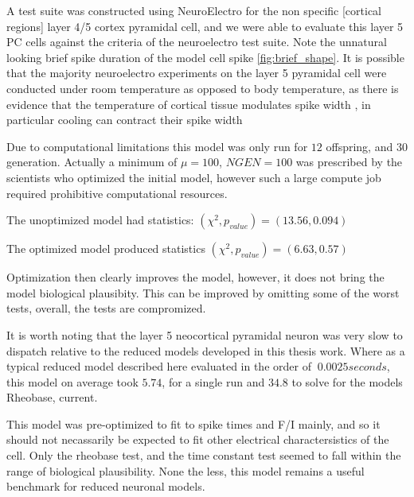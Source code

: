 

A test suite was constructed using NeuroElectro for the non specific [cortical regions] layer 4/5 cortex pyramidal cell, and we were able to evaluate this layer 5 PC cells against the criteria of the neuroelectro test suite. Note the unnatural looking brief spike duration of the model cell spike  \ref{fig:brief_shape}. It is possible that the majority neuroelectro experiments on the layer 5 pyramidal cell were conducted under room temperature as opposed to body temperature, as there is evidence that the temperature of cortical tissue modulates spike width \cite{goldin2017temperature}, in particular cooling can contract their spike width

%


Due to computational limitations this model was only run for 
$12$ offspring, and $30$ generation. Actually a minimum of $\mu=100$, $NGEN =100$ was prescribed by the scientists who optimized the initial model, however such a large compute job required prohibitive computational resources.

The unoptimized model had statistics:
$(\chi^{2},p_{value})=(13.56, 0.094)$

The optimized model produced statistics
$(\chi^{2},p_{value})=(6.63, 0.57)$

Optimization then clearly improves the model, however, it does not bring the model  biological plausibity.
This can be improved by omitting some of the worst tests, overall, the tests are compromized.



It is worth noting that the layer 5 neocortical pyramidal neuron was very slow to dispatch relative to the reduced models developed in this thesis work. Where as a typical reduced model described here evaluated in the order of $~0.0025 seconds$, this model on average took $5.74$, for a single run and $34.8$ to solve for the models Rheobase, current.

This model was pre-optimized to fit to spike times and F/I mainly, and so it should not necassarily be expected to fit other electrical charactersistics of the cell. Only the rheobase test, and the time constant test seemed to fall within the range of biological plausibility.
None the less, this model remains a useful benchmark for reduced neuronal models.